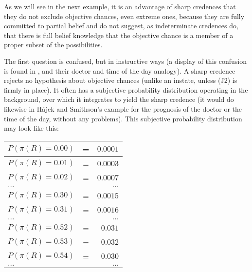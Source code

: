 \documentclass[11pt]{article}
\begin{document}
As we will see in the next example, it is an advantage of sharp
credences that they do not exclude objective chances, even extreme
ones, because they are fully committed to partial belief and do not
suggest, as indeterminate credences do, that there is full belief
knowledge that the objective chance is a member of a proper subset of
the possibilities.


The first question is confused, but in instructive ways (a display of
this confusion is found in , and their
doctor and time of the day analogy). A sharp credence rejects no
hypothesis about objective chances (unlike an instate, unless (J2) is
firmly in place). It often has a subjective probability distribution
operating in the background, over which it integrates to yield the
sharp credence (it would do likewise in H{\'a}jek and Smithson's
example for the prognosis of the doctor or the time of the day,
without any problems). This subjective probability
distribution may look like this:

\begin{tabular}{|lcr|}
  \hline
  $P(\pi(R)=0.00)$ & = & $0.0001$ \\ \hline
  $P(\pi(R)=0.01)$ & = & $0.0003$ \\ \hline
  $P(\pi(R)=0.02)$ & = & $0.0007$ \\ \hline
  $\ldots$ & & $\ldots$ \\ \hline
  $P(\pi(R)=0.30)$ & = & $0.0015$ \\ \hline
  $P(\pi(R)=0.31)$ & = & $0.0016$ \\ \hline
  $\ldots$ & & $\ldots$ \\ \hline
  $P(\pi(R)=0.52)$ & = & $0.031$ \\ \hline
  $P(\pi(R)=0.53)$ & = & $0.032$ \\ \hline
  $P(\pi(R)=0.54)$ & = & $0.030$ \\ \hline
  $\ldots$ & & $\ldots$ \\ \hline
\end{tabular}
\end{document}
